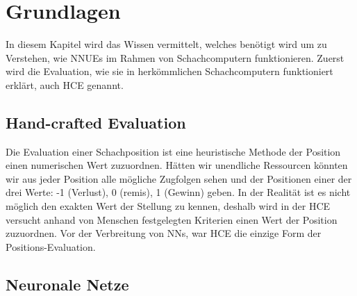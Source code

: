 \chapter{Grundlagen}

In diesem Kapitel wird das Wissen vermittelt, welches benötigt wird um zu Verstehen, wie \acp{NNUE} im Rahmen von Schachcomputern funktionieren. Zuerst wird die Evaluation, wie sie in herkömmlichen Schachcomputern funktioniert erklärt, auch \ac{HCE} genannt.

\section{Hand-crafted Evaluation}
\label{chap:HCE}

Die Evaluation einer Schachposition ist eine heuristische Methode der Position einen numerischen Wert zuzuordnen. Hätten wir unendliche Ressourcen könnten wir aus jeder Position alle mögliche Zugfolgen sehen und der Positionen einer der drei Werte: -1 (Verlust), 0 (remis), 1 (Gewinn) geben. In der Realität ist es nicht möglich den exakten Wert der Stellung zu kennen, deshalb wird in der \ac{HCE} versucht anhand von Menschen festgelegten Kriterien einen Wert der Position zuzuordnen. 
Vor der Verbreitung von \acp{NN}, war \ac{HCE} die einzige Form der Positions-Evaluation. 

\section{Neuronale Netze}


